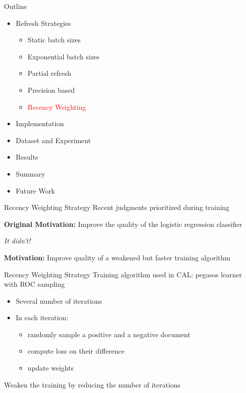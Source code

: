 \documentclass[14pt]{beamer}
\newcommand{\red}[1]{\textcolor{red}{#1}}
\begin{document}


\begin{frame}{Outline}
\begin{itemize}
    \item Refresh Strategies
    \begin{itemize}
        \item Static batch sizes
        \item Exponential batch sizes
        \item Partial refresh
        \item Precision based
        \item \red{Recency Weighting}
    \end{itemize}
    \item Implementation
    \item Dataset and Experiment
    \item Results
    \item Summary
    \item Future Work
\end{itemize}
\end{frame}

\begin{frame}{Recency Weighting Strategy}
Recent judgments prioritized during training
\vskip 1cm

\textbf{Original Motivation:} Improve the quality of the logistic regression classifier
\pause
\centerline{\textit{It didn't!}}
\pause
\vskip 1cm

\textbf{Motivation:} Improve quality of a weakened but faster training algorithm
\end{frame}


\begin{frame}{Recency Weighting Strategy}
    Training algorithm used in CAL: pegasos learner with ROC
    sampling~\cite{sculley2010combined}

\begin{itemize}
    \item Several number of iterations
    \item In each iteration:
        \begin{itemize}
            \item randomly sample a positive and a negative document
            \item compute loss on their difference
            \item update weights
        \end{itemize}
\end{itemize}

\pause
Weaken the training by reducing the number of iterations
\end{frame}
\end{document}
